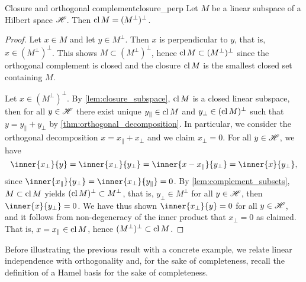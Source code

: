 \begin{theorem}{Closure and orthogonal complement}{closure_perp}
    Let \(M\) be a linear subspace of a Hilbert space \(\mathscr{H}\). Then \(\operatorname{cl}{M} = (M^\perp)^\perp\).
\end{theorem}
\begin{proof}
    Let \(x \in M\) and let \(y \in M^\perp\). Then \(x\) is perpendicular to \(y\), that is, \(x \in (M^\perp)^\perp\). This shows \(M \subset (M^\perp)^\perp\), hence \(\operatorname{cl} M \subset (M^\perp)^\perp\) since the orthogonal complement is closed and the closure \(\operatorname{cl}{M}\) is the smallest closed set containing \(M\).

    Let \(x \in (M^\perp)^\perp\). By \cref{lem:closure_subspace}, \(\operatorname{cl}{M}\) is a closed linear subspace, then for all \(y \in \mathscr{H}\) there exist unique \(y_\parallel \in \operatorname{cl}{M}\) and \(y_\perp \in (\operatorname{cl}{M})^\perp\) such that \(y = y_\parallel + y_\perp\) by \cref{thm:orthogonal_decomposition}. In particular, we consider the orthogonal decomposition \(x = x_\parallel + x_\perp\) and we claim \(x_\perp = 0\). For all \(y \in \mathscr{H}\), we have
    \begin{equation*}
        \inner{x_\perp}{y} = \inner{x_\perp}{y_\perp} = \inner{x - x_\parallel}{y_\perp} = \inner{x}{y_\perp},
    \end{equation*}
    since \(\inner{x_\parallel}{y_\perp} = \inner{x_\perp}{y_\parallel} = 0\). By \cref{lem:complement_subsets}, \(M \subset \operatorname{cl}{M}\) yields \((\operatorname{cl}{M})^\perp \subset M^\perp\), that is, \(y_\perp \in M^\perp\) for all \(y \in \mathscr{H}\), then \(\inner{x}{y_\perp} = 0\). We have thus shown \(\inner{x_\perp}{y} = 0\) for all \(y \in \mathscr{H}\), and it follows from non-degeneracy of the inner product that \(x_\perp = 0\) as claimed. That is, \(x = x_\parallel \in \operatorname{cl}{M}\), hence \((M^\perp)^\perp \subset \operatorname{cl}{M}\).
\end{proof}

Before illustrating the previous result with a concrete example, we relate linear independence with orthogonality and, for the sake of completeness, recall the definition of a Hamel basis for the sake of completeness.

